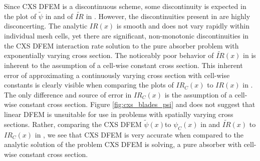 Since CXS DFEM is a discontinuous scheme, some discontinuity is expected in the plot of $\widetilde{\psi}$ in  and of $\widetilde{IR}$ in . 
However, the discontinuities present in  are highly disconcerting.
The analytic $IR(x)$ is smooth and does not vary rapidly within individual mesh cells, yet there are significant, non-monotonic discontinuities in the CXS DFEM interaction rate solution to the pure absorber problem with exponentially varying cross section.
The noticeably poor behavior of $\widetilde{IR}(x)$ in  is inherent to the assumption of a cell-wise constant cross section.
This inherent error of approximating a continuously varying cross section with cell-wise constants is clearly visible when comparing the plots of $IR_C(x)$ to $IR(x)$ in .
The only difference and source of error in $IR_C(x)$ is the assumption of a cell-wise constant cross section.
Figure \ref{fig:cxs_blades_psi} and  does not suggest that linear DFEM is unsuitable for use in problems with spatially varying cross sections. 
Rather, comparing the CXS DFEM $\widetilde{\psi}(x)$to $\psi_C(x)$ in  and $\widetilde{IR}(x)$ to $IR_C(x)$ in , we see that CXS DFEM  is very accurate when compared to the analytic solution of the problem CXS DFEM is solving, a pure absorber with cell-wise constant cross section.

